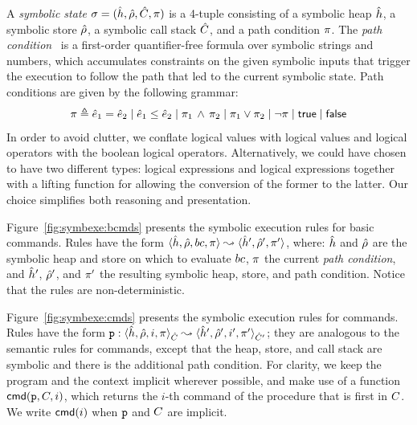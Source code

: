 %
A \emph{symbolic state} $\sigma = (\hat{h}, \hat\rho, \hat{C}, \pi)$ is a 4-tuple consisting of a 
symbolic heap $\hat{h}$, a symbolic store $\hat\rho$, a symbolic call stack $\hat{C}$, and a path condition $\pi$. 
The \emph{path condition}~\cite{symb:exec:survey} is a first-order quantifier-free formula over symbolic strings and 
numbers, which accumulates constraints on the given symbolic inputs that trigger 
the execution to follow the path that led to the current symbolic state. 
Path conditions are given by the following grammar: 
\begin{equation*}
\pi \triangleq \hat{e}_1 = \hat{e}_2 \mid \hat{e}_1 \leq \hat{e}_2 \mid \pi_1 \, \wedge \, \pi_2 \mid \pi_1 \vee \pi_2 \mid \neg \pi \mid {\sf true} \mid {\sf false}
\end{equation*}
In order to avoid clutter, we conflate logical values with \jsil logical values and \jsil logical 
operators with the boolean logical operators. Alternatively, we could have chosen to 
have two different types: \jsil logical expressions and logical expressions together with a lifting 
function for allowing the conversion of the former to the latter. Our choice simplifies both reasoning 
and presentation. 

Figure~\ref{fig:symbexe:bcmds} presents the symbolic execution rules for \jsil basic commands. 
Rules have the form $\symbtrans{\sheap, \sstore, \bcmd, \pc}{\sheap', \sstore', \pc'}$, 
where:  $\hat{h}$ and $\hat\rho$ are the symbolic heap and store on which to evaluate $bc$, 
 $\pi$ the current \emph{path condition}, and  $\hat{h}'$, $\hat\rho'$, and $\pi'$
the resulting symbolic heap, store, and path condition. Notice that the rules are non-deterministic.

Figure~\ref{fig:symbexe:cmds} presents the symbolic execution rules for \jsil commands. 
Rules have the form $\symbtrans[\prog]{\sheap, \sstore, i, \pc}{\sheap', \sstore', i', \pc'}[\sctx][\sctx']$; 
they are analogous to the semantic rules for \jsil commands, except that the heap, store, and call stack 
are symbolic and there is the additional path condition. For clarity, we keep 
the program and the context implicit wherever possible, and make use of a function $\ccmd{\prog, \ctx, i}$, which 
returns the $i$-th command of the procedure that is first in $C$. We write $\ccmd{i}$ when $\mathtt{p}$ and $C$ are implicit.


